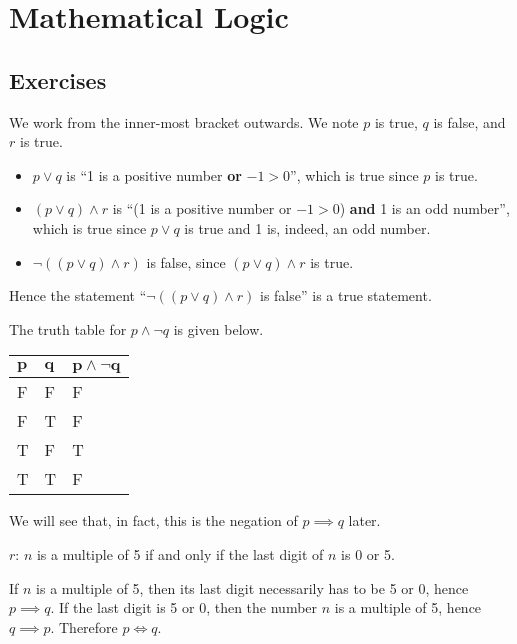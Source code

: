 \section{Mathematical Logic}
\subsection*{Exercises}
\begin{questions}
    \item We work from the inner-most bracket outwards. We note $p$ is true, $q$ is false, and $r$ is true.
    \begin{itemize}
        \item $p \lor q$ is ``1 is a positive number \textbf{or} $-1 > 0$'', which is true since $p$ is true.
        \item $(p \lor q) \land r$ is ``(1 is a positive number or $-1 > 0$) \textbf{and} 1 is an odd number'', which is true since $p \lor q$ is true and 1 is, indeed, an odd number.
        \item $\lnot((p \lor q) \land r)$ is false, since $(p \lor q) \land r$ is true.
    \end{itemize}
    Hence the statement ``$\lnot((p \lor q) \land r)$ is false'' is a true statement.

    \item The truth table for $p \land \lnot q$ is given below.
    \begin{table}[H]
        \centering
        \begin{tabular}{|l|l||l|}
            \hline
            $\boldsymbol{p}$ & $\boldsymbol{q}$ & $\boldsymbol{p\land \lnot q}$ \\ \hline
            F & F & F \\ \hline
            F & T & F \\ \hline
            T & F & T \\ \hline
            T & T & F \\ \hline
        \end{tabular}
    \end{table}

    We will see that, in fact, this is the negation of $p \implies q$ later.

    \item \begin{partquestions}{\roman*}
        \item $r$: $n$ is a multiple of 5 if and only if the last digit of $n$ is 0 or 5.
        \item If $n$ is a multiple of 5, then its last digit necessarily has to be 5 or 0, hence $p \implies q$. If the last digit is 5 or 0, then the number $n$ is a multiple of 5, hence $q \implies p$. Therefore $p \iff q$.
    \end{partquestions}


\end{questions}
